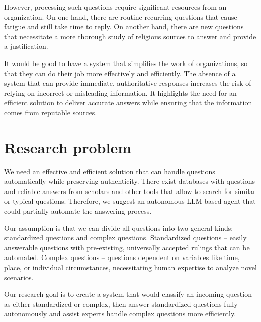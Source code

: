 However, processing such questions require significant resources from an organization. On one hand, there are routine recurring questions that cause fatigue and still take time to reply. On another hand, there are new questions that necessitate a more thorough study of religious sources to answer and provide a justification. 

It would be good to have a system that simplifies the work of organizations, so that they can do their job more effectively and efficiently.
The absence of a system that can provide immediate, authoritative responses increases the risk of relying on incorrect or misleading information. It highlights the need for an efficient solution to deliver accurate answers while ensuring that the information comes from reputable sources.
     
\section{Research problem}
We need an effective and efficient solution that can handle questions automatically while preserving authenticity. There exist databases with questions and reliable answers from scholars and other tools that allow to search for similar or typical questions. Therefore, we suggest an autonomous LLM-based agent that could partially automate the answering process. 

Our assumption is that we can divide all questions into two general kinds:
standardized questions and complex questions. Standardized questions – easily answerable questions with pre-existing, universally accepted rulings that can be automated. Complex questions – questions dependent on variables like time, place, or individual circumstances, necessitating human expertise to analyze novel scenarios. 

Our research goal is to create a system that would classify an incoming question as either standardized or complex, then answer standardized questions fully autonomously and assist experts handle complex questions more efficiently.

